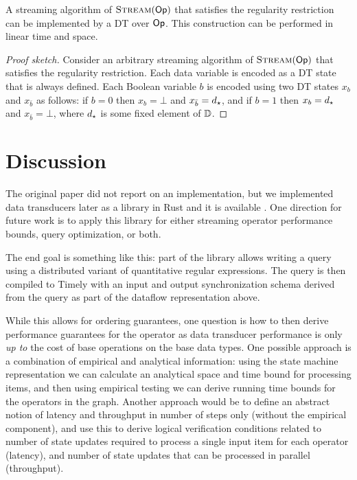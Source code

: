 \begin{theorem}
A streaming algorithm of $\textsc{Stream}(\textsf{Op})$ that satisfies the regularity restriction can be implemented by a DT over $\textsf{Op}$. This construction can be performed in linear time and space.
\end{theorem}
\begin{proof}[Proof sketch]
Consider an arbitrary streaming algorithm of $\textsc{Stream}(\textsf{Op})$ that satisfies the regularity restriction. Each data variable is encoded as a DT state that is always defined. Each Boolean variable $b$ is encoded using two DT states $x_b$ and $x_{\bar b}$ as follows: if $b = 0$ then $x_b = \bot$ and $x_{\bar b} = d_\star$, and if $b = 1$ then $x_b = d_\star$ and $x_{\bar b} = \bot$, where $d_\star$ is some fixed element of $\mathbb{D}$.
\end{proof}

\section{Discussion}
\label{dt:sec:discussion}

The original paper did not report on an implementation, but we implemented data transducers later as a library in Rust
and it is available .
One direction for future work is to apply this library for either streaming operator performance bounds, query optimization, or both.

The end goal is something like this: part of the library allows writing
a query using a distributed variant of quantitative regular expressions.
The query is then compiled to Timely with an input and output synchronization schema derived from the query as part of the dataflow representation above.

While this allows for ordering guarantees, one question is how to then derive performance guarantees for the operator as data transducer performance is only \emph{up to} the cost of base operations on the base data types.
One possible approach is a combination of empirical and analytical information: using the state machine representation we can calculate an analytical space and time bound for processing items,
and then using empirical testing we can derive running time bounds for the operators in the graph.
Another approach would be to define an abstract notion of latency and throughput in number of steps only (without the empirical component),
and use this to derive logical verification conditions related to number of state updates required to process a single input item for each operator (latency),
and number of state updates that can be processed in parallel (throughput).

